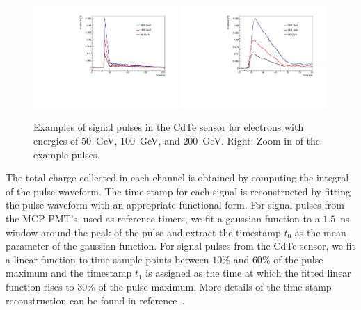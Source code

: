 \documentclass[preprint,1p]{elsarticle}
\begin{document}
\begin{figure}[htbp] 
\centering
\includegraphics[width=0.49\textwidth]{figures/TypicalPulses.pdf}
\includegraphics[width=0.49\textwidth]{figures/TypicalPulses_Zoom.pdf} 
\caption{Examples of signal pulses in the CdTe sensor for electrons with energies of $50$~GeV,
$100$~GeV, and $200$~GeV. Right: Zoom in of the example pulses.} 
\label{fig:Pulses} 
\end{figure} 

The total charge collected in each channel is obtained by computing the integral of the pulse
waveform. The time stamp for each signal is reconstructed by fitting the pulse waveform with
an appropriate functional form. For signal pulses from the MCP-PMT's, used as reference timers, 
we fit a gaussian function to a $1.5$~ns window around the peak of the pulse and extract the 
timestamp $t_{0}$ as the mean parameter of the gaussian function. For signal pulses from the
CdTe sensor, we fit a linear function to time sample points between $10\%$ and $60\%$ of the pulse
maximum and the timestamp $t_{1}$ is assigned as the time at which the fitted linear function
rises to $30\%$ of the pulse maximum. More details of the time stamp reconstruction can be
found in reference~\cite{Anderson:2015gha}.
\end{document}

